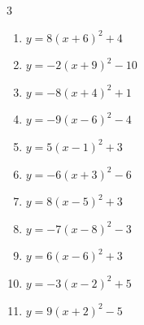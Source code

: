 \begin{multicols}{3}
\begin{enumerate}
        \phantom{$\displaystyle 頂点\left( 7 , 0 \right)$}

  \item $\displaystyle y=8\left( x+6\right)^{2}+4$

        \phantom{$\displaystyle 頂点\left( -6 , 4 \right)$}

  \item $\displaystyle y=-2\left( x+9\right)^{2}-10$

        \phantom{$\displaystyle 頂点\left( -9 , -10 \right)$}

  \item $\displaystyle y=-8\left( x+4\right)^{2}+1$

        \phantom{$\displaystyle 頂点\left( -4 , 1 \right)$}

  \item $\displaystyle y=-9\left( x-6\right)^{2}-4$

        \phantom{$\displaystyle 頂点\left( 6 , -4 \right)$}

  \item $\displaystyle y=5\left( x-1\right)^{2}+3$

        \phantom{$\displaystyle 頂点\left( 1 , 3 \right)$}

  \item $\displaystyle y=-6\left( x+3\right)^{2}-6$

        \phantom{$\displaystyle 頂点\left( -3 , -6 \right)$}

  \item $\displaystyle y=8\left( x-5\right)^{2}+3$

        \phantom{$\displaystyle 頂点\left( 5 , 3 \right)$}

  \item $\displaystyle y=-7\left( x-8\right)^{2}-3$

        \phantom{$\displaystyle 頂点\left( 8 , -3 \right)$}

  \item $\displaystyle y=6\left( x-6\right)^{2}+3$

        \phantom{$\displaystyle 頂点\left( 6 , 3 \right)$}

  \item $\displaystyle y=-3\left( x-2\right)^{2}+5$

        \phantom{$\displaystyle 頂点\left( 2 , 5 \right)$}

  \item $\displaystyle y=9\left( x+2\right)^{2}-5$

        \phantom{$\displaystyle 頂点\left( -2 , -5 \right)$}


\end{enumerate}
\end{multicols}
